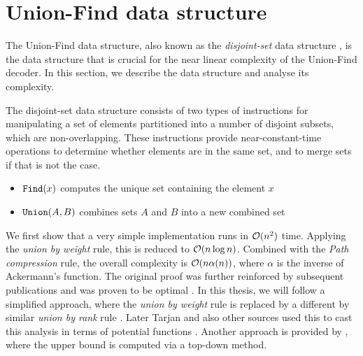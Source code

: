 \chapter{Union-Find data structure}\label{ap:unionfind}
The Union-Find data structure, also known as the \emph{disjoint-set} data structure \cite{tarjan1975efficiency}, is the data structure that is crucial for the near linear complexity of the Union-Find decoder. In this section, we describe the data structure and analyse its complexity. 

The disjoint-set data structure consists of two types of instructions for manipulating a set of elements partitioned into a number of disjoint subsets, which are non-overlapping. These instructions provide near-constant-time operations to determine whether elements are in the same set, and to merge sets if that is not the case. 
\begin{itemize}
  \item $\texttt{Find}(x)$ computes the unique set containing the element $x$
  \item $\texttt{Union}(A,B)$ combines sets $A$ and $B$ into a new combined set
\end{itemize}
We first show that a very simple implementation runs in $\mathcal{O}(n^2)$ time. Applying the \emph{union by weight} rule, this is reduced to $\mathcal{O}(n \log n)$. Combined with the \emph{Path compression} rule, the overall complexity is $\mathcal{O}(n \alpha (n))$, where $\alpha$ is the inverse of Ackermann's function. The original proof \cite{tarjan1975efficiency} was further reinforced by subsequent publications \cite{tarjan1979class,tarjan1984worst} and was proven to be optimal \cite{fredman1989cell}. In this thesis, we will follow a simplified approach, where the \emph{union by weight} rule is replaced by a different by similar \emph{union by rank} rule \cite{kozen1992design}. Later Tarjan and also other sources used this to cast this analysis in terms of potential functions \cite{tarjan1999handout, harfst2000potential, cormen2009introduction}. Another approach is provided by \cite{seidel2005top}, where the upper bound is computed via a top-down method. 


